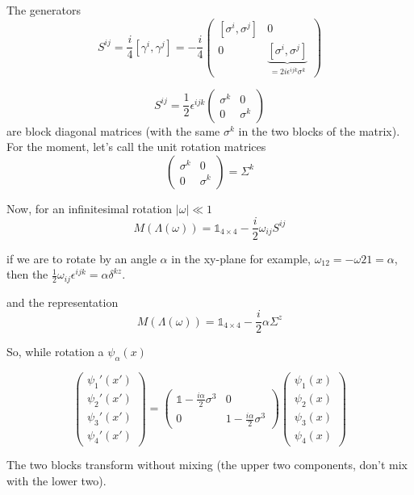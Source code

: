 \documentclass[11pt]{article}
\begin{document}
	The generators \[ S^{ij} = \frac{i}{4} [\gamma^i, \gamma^j] = - \frac{i}{4} \begin{pmatrix}
		[\sigma^i, \sigma^j] & 0 \\
		0 & \underbrace{[\sigma^i, \sigma^j]}_{=2i\epsilon^{ijk}\sigma^k}
	\end{pmatrix}\]

		\[ S^{ij} = \frac{1}{2} \epsilon^{ijk} \begin{pmatrix}
			\sigma^k & 0 \\
			0 & \sigma^k
		\end{pmatrix}\]
	are block diagonal matrices (with the same $\sigma^k$ in the two blocks of the matrix).\\
	
	For the moment, let's call the unit rotation matrices \[\begin{pmatrix}
		\sigma^k & 0 \\ 0 & \sigma^k
	\end{pmatrix} = \Sigma^k \]

		Now, for an infinitesimal rotation $|\omega| \ll 1$
		 \[ M(\Lambda(\omega)) = \mathbb{1}_{4 \times 4} - \frac{i}{2}\omega_{ij}S^{ij} \]
		 
		 
		if we are to rotate by an angle $\alpha$ in the xy-plane for example, $\omega_{12} =- \omega{21} = \alpha$, then the $\frac{1}{2} \omega_{ij}\epsilon^{ijk} = \alpha \delta^{kz}$.
		
		and the representation \[ M(\Lambda(\omega)) = \mathbb{1}_{4\times 4} - \frac{i}{2} \alpha \Sigma^z\]
		
	So, while rotation a $\psi_\alpha(x)$
	
	\[ \begin{pmatrix}
		\psi_1'(x')\\ \psi_2'(x')\\ \psi_3'(x')\\ \psi_4'(x')
	\end{pmatrix} = \begin{pmatrix}
						\mathbb{1} - \frac{i\alpha}{2}\sigma^3 & 0 \\
						0 & 1 - \frac{i\alpha}{2} \sigma^3
					\end{pmatrix} \begin{pmatrix}
					\psi_1(x)\\ \psi_2(x)\\ \psi_3(x)\\ \psi_4(x)
				\end{pmatrix}\]
		 
		 The two blocks transform without mixing (the upper two components, don't mix with the lower two).\\
		 
\end{document}
